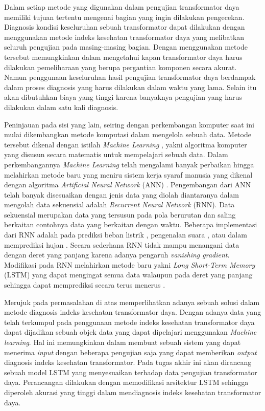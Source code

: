 Dalam setiap metode yang digunakan dalam pengujian transformator daya memiliki tujuan tertentu mengenai bagian yang ingin dilakukan pengecekan. Diagnosis kondisi keseluruhan sebuah transformator dapat dilakukan dengan menggunakan metode indeks kesehatan transformator daya yang melibatkan seluruh pengujian pada masing-masing bagian\cite{jahromi2009approach}. Dengan menggunakan metode tersebut memungkinkan dalam mengetahui kapan transformator daya harus dilakukan pemeliharaan yang berupa pergantian komponen secara akurat. Namun penggunaan keseluruhan hasil pengujian transformator daya berdampak dalam proses diagnosis yang harus dilakukan dalam waktu yang lama. Selain itu akan dibutuhkan biaya yang tinggi karena banyaknya pengujian yang harus dilakukan dalam satu kali diagnosis. 

Peninjauan pada sisi yang lain, seiring dengan perkembangan komputer saat ini mulai dikembangkan metode komputasi dalam mengelola sebuah data. Metode tersebut dikenal dengan istilah \textit{Machine Learning} \cite{jordan2015machine}, yakni algoritma komputer yang disusun secara matematis untuk mempelajari sebuah data. Dalam perkembangannya \textit{Machine Learning} telah mengalami banyak perbaikan hingga melahirkan metode baru yang meniru sistem kerja syaraf manusia yang dikenal dengan algoritma \textit{Artificial Neural Network} (ANN) \cite{braspenning1995artificial}. Pengembangan dari ANN telah banyak disesuaikan dengan jenis data yang diolah diantaranya dalam mengolah data sekuensial adalah \textit{Recurrent Neural Network} (RNN). Data sekuensial merupakan data yang tersusun pada pola berurutan dan saling berkaitan contohnya data yang berkaitan dengan waktu. Beberapa implementasi dari RNN adalah pada prediksi beban listrik \cite{tokgoz2018rnn, tang2019application, deihimi2012application}, pengenalan suara \cite{miao2015eesen, amberkar2018speech}, atau dalam memprediksi hujan \cite{habi2019rnn}. Secara sederhana RNN tidak mampu menangani data dengan deret yang panjang karena adanya pengaruh \textit{vanishing gradient}. Modifikasi pada RNN melahirkan metode baru yakni \textit{Long Short-Term Memory} (LSTM) yang dapat mengingat semua data walaupun pada deret yang panjang sehingga dapat memprediksi secara terus menerus \cite{gers1999learning}. \par 

Merujuk pada permasalahan di atas memperlihatkan adanya sebuah solusi dalam metode diagnosis indeks kesehatan transformator daya. Dengan adanya data yang telah terkumpul pada penggunaan metode indeks kesehatan transformator daya dapat dijadikan sebuah objek data yang dapat dipelajari menggunakan \textit{Machine learning}. Hal ini memungkinkan dalam membuat sebuah sistem yang dapat menerima \textit{input} dengan beberapa pengujian saja yang dapat memberikan \textit{output} diagnosis indeks kesehatan transformator. Pada tugas akhir ini akan dirancang sebuah model LSTM yang menyesuaikan terhadap data pengujian transformator daya. Perancangan dilakukan dengan memodifikasi arsitektur LSTM sehingga diperoleh akurasi yang tinggi dalam mendiagnosis indeks kesehatan transformator daya. 

